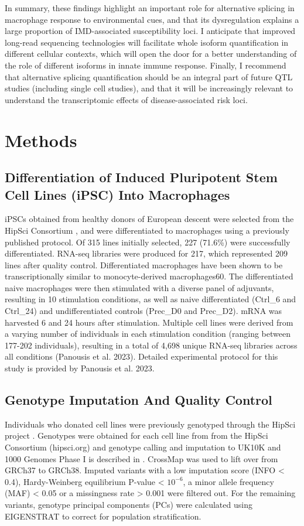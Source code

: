 In summary, these findings highlight an important role for alternative splicing in macrophage response to environmental cues, and that its dysregulation explains a large proportion of IMD-associated susceptibility loci. I anticipate that improved long-read sequencing technologies will facilitate whole isoform quantification in different cellular contexts, which will open the door for a better understanding of the role of different isoforms in innate immune response. Finally, I recommend that alternative splicing quantification should be an integral part of future QTL studies (including single cell studies), and that it will be increasingly relevant to understand the transcriptomic effects of disease-associated risk loci. 
\newpage
\section{Methods}

\subsection{Differentiation of Induced Pluripotent Stem Cell Lines (iPSC) Into Macrophages}

iPSCs obtained from healthy donors of European descent were selected from the HipSci Consortium \cite{Kilpinen2017-qm}, and were differentiated to macrophages using a previously published protocol. Of 315 lines initially selected, 227 (71.6\%) were successfully differentiated. RNA-seq libraries were produced for 217, which represented 209 lines after quality control. Differentiated macrophages have been shown to be transcriptionally similar to monocyte-derived macrophages60. The differentiated naive macrophages were then stimulated with a diverse panel of adjuvants, resulting in 10 stimulation conditions, as well as naive differentiated (Ctrl\_6 and Ctrl\_24) and undifferentiated controls (Prec\_D0 and Prec\_D2). mRNA was harvested 6 and 24 hours after stimulation. Multiple cell lines were derived from a varying number of individuals in each stimulation condition (ranging between 177-202 individuals), resulting in a total of 4,698 unique RNA-seq libraries across all conditions (Panousis et al. 2023). Detailed experimental protocol for this study is provided by Panousis et al. 2023.

\subsection{Genotype Imputation And Quality Control}
Individuals who donated cell lines were previously genotyped through the HipSci project \cite{Kilpinen2017-qm}. Genotypes were obtained for each cell line from from the HipSci Consortium  (hipsci.org) and genotype calling and imputation to  UK10K and 1000 Genomes Phase I is described in \cite{Kilpinen2017-qm}. CrossMap \cite{Zhao2014-ve} was used to lift over from GRCh37 to GRCh38. Imputed variants with a low imputation score (INFO < 0.4), Hardy-Weinberg equilibrium P-value < $10^{-6}$, a minor allele frequency (MAF) < 0.05 or a missingness rate > 0.001 were filtered out. For the remaining variants, genotype principal components (PCs) were calculated using EIGENSTRAT \cite{Price2006-kr} to correct for population stratification.

